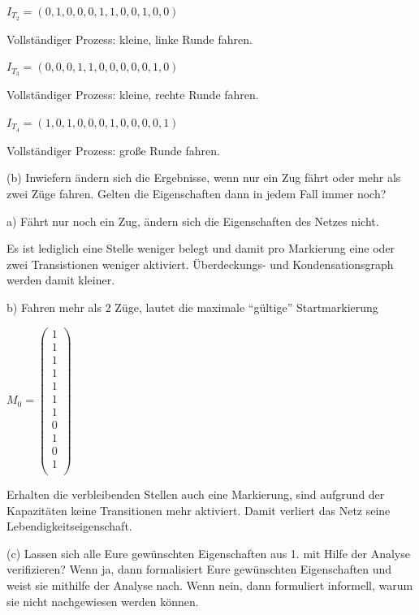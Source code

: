\documentclass{scrreprt}
\begin{document}
\begin{enumerate}
$I_{T_2} = (0, 1, 0, 0, 0, 1, 1, 0, 0, 1, 0, 0)$

Vollständiger Prozess: kleine, linke Runde fahren.

$I_{T_3} = (0, 0, 0, 1, 1, 0, 0, 0, 0, 0, 1, 0)$

Vollständiger Prozess: kleine, rechte Runde fahren.

$I_{T_4} = (1, 0, 1, 0, 0, 0, 1, 0, 0, 0, 0, 1)$

Vollständiger Prozess: große Runde fahren.

(b) Inwiefern ändern sich die Ergebnisse, wenn nur ein Zug fährt oder mehr als zwei Züge fahren. Gelten die Eigenschaften dann in jedem Fall immer noch?

a) Fährt nur noch ein Zug, ändern sich die Eigenschaften des Netzes nicht. 

Es ist lediglich eine Stelle weniger belegt und damit pro Markierung eine oder zwei Transistionen weniger aktiviert. Überdeckungs- und Kondensationsgraph werden damit kleiner.


b) Fahren mehr als 2 Züge, lautet die maximale ``gültige'' Startmarkierung

\( M_0 = \begin{pmatrix}
1 \\ %
1 \\ %
1 \\ %
1 \\ %
1 \\ %
1 \\ %
1 \\ %
0 \\ %
1 \\ %
0 \\ %
1 \\ %
\end{pmatrix} \)

Erhalten die verbleibenden Stellen auch eine Markierung, sind aufgrund der Kapazitäten keine Transitionen mehr aktiviert. Damit verliert das Netz seine Lebendigkeitseigenschaft.

(c) Lassen sich alle Eure gewünschten Eigenschaften aus 1. mit Hilfe der Analyse verifizieren? Wenn ja, dann formalisiert Eure gewünschten Eigenschaften und weist sie mithilfe der Analyse nach. Wenn nein, dann formuliert informell, warum sie nicht nachgewiesen werden können.


\end{enumerate}
\end{document}
